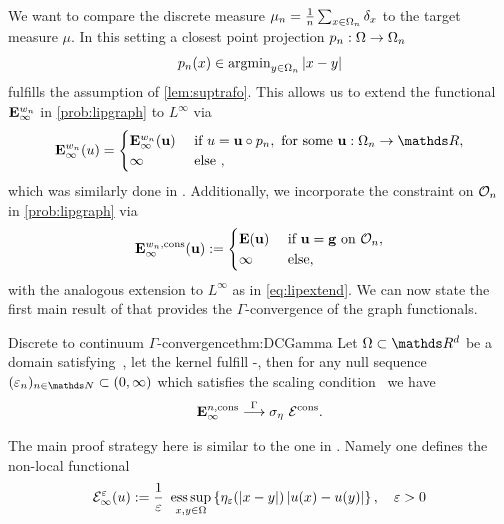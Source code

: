 %
%
\noindent%
We want to compare the discrete measure $\mu_n = \frac{1}{n}\sum_{x\in\Omega_n} \delta_x$ to the target measure $\mu$. In this setting a closest point projection $p_n:\Omega\to\Omega_n$
%
\begin{align*}
p_n(x) \in \operatorname{argmin}_{y\in\Omega_n} \left|x- y\right|
\end{align*}
%
fulfills the assumption of \cref{lem:suptrafo}. This allows us to extend the functional $\mathbf{E}^{w_n}_\infty$ in \cref{prob:lipgraph} to $L^\infty$ via
%
\begin{align}\label{eq:lipextend}
\GE^{w_n}_\infty(u) = 
%
\begin{cases}
\GE^{w_n}_\infty(\vec u) &\text{ if } u=\vec u \circ p_n,\text{ for some } \vec u :\domain_n\to\R,\\
\infty &\text{ else },
\end{cases}
\end{align}
%
which was similarly done in \cite{GarcSlep15, slepcev2019analysis}. Additionally, we incorporate the constraint on $\mathcal{O}_n$ in \cref{prob:lipgraph} via
%
\begin{align*}
\mathbf{E}^{w_n, \text{cons}}_\infty (\mathbf{u}):=
\begin{cases}
\mathbf{E}(\mathbf{u})&\text{ if } \mathbf{u} = \mathbf{g} \text{ on } \mathcal{O}_n,\\
\infty &\text{ else},
\end{cases}
\end{align*}
%
with the analogous extension to $L^\infty$ as in \cref{eq:lipextend}. We can now state the first main result of \cite{roith2022continuum} that provides the $\Gamma$-convergence of the graph functionals.
%
%
\begin{theorem}{Discrete to continuum $\Gamma$-convergence}{thm:DCGamma}
Let $\domain\subset\R^d$ be a domain satisfying~, let the kernel fulfill -, then for any null sequence $(\gscale_n)_{n\in\N}\subset(0,\infty)$ which satisfies the scaling condition~
we have
\begin{align}
\mathbf{E}^{n,\mathrm{cons}}_\infty \overset{\Gamma}{\longrightarrow} \sigma_{\eta}~\mathcal{E}^\mathrm{cons}.
\end{align}
\end{theorem}
%
\noindent%
The main proof strategy here is similar to the one in \cite{GarcSlep15, slepcev2019analysis}. Namely one defines the non-local functional
%
\begin{align*}
\mathcal{E}^{\varepsilon}_\infty(u) := \frac{1}{\varepsilon}~\operatorname*{ess\,sup}_{x,y\in\Omega}
\left\{
\eta_{\varepsilon}(\left|x-y\right|)\left|u(x) - u(y)\right|
\right\},\quad\varepsilon>0
\end{align*}
